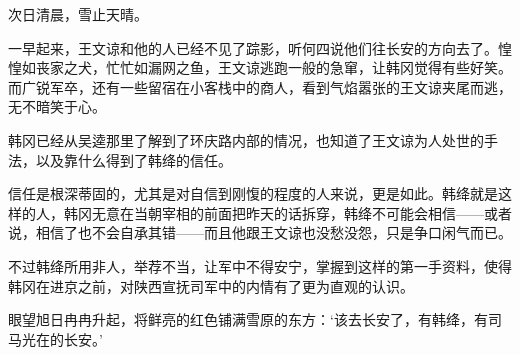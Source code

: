 次日清晨，雪止天晴。

一早起来，王文谅和他的人已经不见了踪影，听何四说他们往长安的方向去了。惶惶如丧家之犬，忙忙如漏网之鱼，王文谅逃跑一般的急窜，让韩冈觉得有些好笑。而广锐军卒，还有一些留宿在小客栈中的商人，看到气焰嚣张的王文谅夹尾而逃，无不暗笑于心。

韩冈已经从吴逵那里了解到了环庆路内部的情况，也知道了王文谅为人处世的手法，以及靠什么得到了韩绛的信任。

信任是根深蒂固的，尤其是对自信到刚愎的程度的人来说，更是如此。韩绛就是这样的人，韩冈无意在当朝宰相的前面把昨天的话拆穿，韩绛不可能会相信——或者说，相信了也不会自承其错——而且他跟王文谅也没愁没怨，只是争口闲气而已。

不过韩绛所用非人，举荐不当，让军中不得安宁，掌握到这样的第一手资料，使得韩冈在进京之前，对陕西宣抚司军中的内情有了更为直观的认识。

眼望旭日冉冉升起，将鲜亮的红色铺满雪原的东方：‘该去长安了，有韩绛，有司马光在的长安。’

